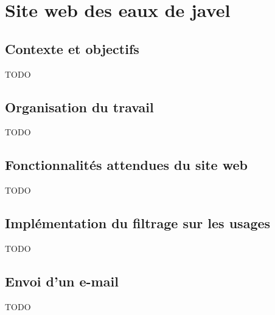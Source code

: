 \section{Site web des eaux de javel \alc}

\subsection{Contexte et objectifs}

TODO


\subsection{Organisation du travail}

TODO


\subsection{Fonctionnalités attendues du site web}

TODO


\subsection{Implémentation du filtrage sur les usages}

TODO


\subsection{Envoi d'un e-mail}

TODO
